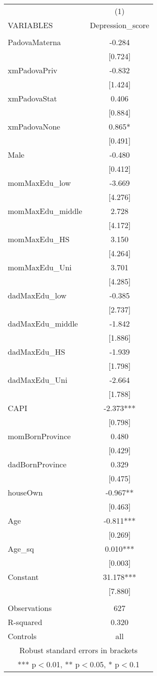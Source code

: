 \documentclass[]{article}
\begin{document}
\begin{tabular}{lc} \hline
 & (1) \\
VARIABLES & Depression\_score \\ \hline
 &  \\
PadovaMaterna & -0.284 \\
 & [0.724] \\
xmPadovaPriv & -0.832 \\
 & [1.424] \\
xmPadovaStat & 0.406 \\
 & [0.884] \\
xmPadovaNone & 0.865* \\
 & [0.491] \\
Male & -0.480 \\
 & [0.412] \\
momMaxEdu\_low & -3.669 \\
 & [4.276] \\
momMaxEdu\_middle & 2.728 \\
 & [4.172] \\
momMaxEdu\_HS & 3.150 \\
 & [4.264] \\
momMaxEdu\_Uni & 3.701 \\
 & [4.285] \\
dadMaxEdu\_low & -0.385 \\
 & [2.737] \\
dadMaxEdu\_middle & -1.842 \\
 & [1.886] \\
dadMaxEdu\_HS & -1.939 \\
 & [1.798] \\
dadMaxEdu\_Uni & -2.664 \\
 & [1.788] \\
CAPI & -2.373*** \\
 & [0.798] \\
momBornProvince & 0.480 \\
 & [0.429] \\
dadBornProvince & 0.329 \\
 & [0.475] \\
houseOwn & -0.967** \\
 & [0.463] \\
Age & -0.811*** \\
 & [0.269] \\
Age\_sq & 0.010*** \\
 & [0.003] \\
Constant & 31.178*** \\
 & [7.880] \\
 &  \\
Observations & 627 \\
R-squared & 0.320 \\
 Controls & all \\ \hline
\multicolumn{2}{c}{ Robust standard errors in brackets} \\
\multicolumn{2}{c}{ *** p$<$0.01, ** p$<$0.05, * p$<$0.1} \\
\end{tabular}
\end{document}

